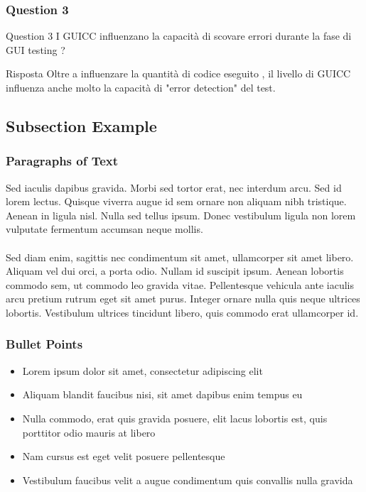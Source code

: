 \documentclass[12pt]{beamer}
\begin{document}
\begin{frame}
\frametitle{Question 3}

\begin{block}{Question 3}
I GUICC influenzano la capacit\`a di scovare errori durante la fase di GUI testing ?
\end{block}

\begin{block}{Risposta}
Oltre a influenzare la quantit\`a di codice eseguito ,  il livello di GUICC influenza anche molto la capacit\`a di "error detection" del test.
\end{block}

\end{frame}



\subsection{Subsection Example} %

\begin{frame}
\frametitle{Paragraphs of Text}
Sed iaculis dapibus gravida. Morbi sed tortor erat, nec interdum arcu. Sed id lorem lectus. Quisque viverra augue id sem ornare non aliquam nibh tristique. Aenean in ligula nisl. Nulla sed tellus ipsum. Donec vestibulum ligula non lorem vulputate fermentum accumsan neque mollis.\\~\\

Sed diam enim, sagittis nec condimentum sit amet, ullamcorper sit amet libero. Aliquam vel dui orci, a porta odio. Nullam id suscipit ipsum. Aenean lobortis commodo sem, ut commodo leo gravida vitae. Pellentesque vehicula ante iaculis arcu pretium rutrum eget sit amet purus. Integer ornare nulla quis neque ultrices lobortis. Vestibulum ultrices tincidunt libero, quis commodo erat ullamcorper id.
\end{frame}


\begin{frame}
\frametitle{Bullet Points}
\begin{itemize}
\item Lorem ipsum dolor sit amet, consectetur adipiscing elit
\item Aliquam blandit faucibus nisi, sit amet dapibus enim tempus eu
\item Nulla commodo, erat quis gravida posuere, elit lacus lobortis est, quis porttitor odio mauris at libero
\item Nam cursus est eget velit posuere pellentesque
\item Vestibulum faucibus velit a augue condimentum quis convallis nulla gravida
\end{itemize}
\end{frame}
\end{document}
